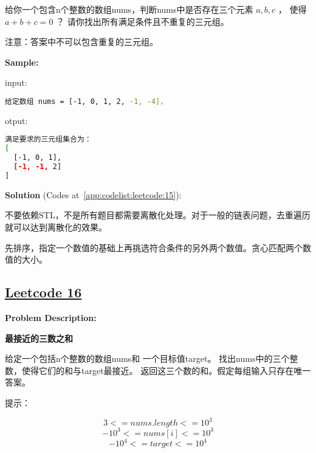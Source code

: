 给你一个包含n个整数的数组nums，判断nums中是否存在三个元素 $ a, b, c $ ，
使得 $ a + b + c = 0 $ ？
请你找出所有满足条件且不重复的三元组。\par

注意：答案中不可以包含重复的三元组。\par


\textbf{Sample:}\par

input:\par

\begin{lstlisting}[language=bash]
给定数组 nums = [-1, 0, 1, 2, -1, -4]，
\end{lstlisting}

otput:\par

\begin{lstlisting}[language=bash]
满足要求的三元组集合为：
[
  [-1, 0, 1],
  [-1, -1, 2]
]
\end{lstlisting}

\textbf{Solution }(Codes at~\ref{app:codelist:leetcode:15}):\par

不要依赖STL，不是所有题目都需要离散化处理。对于一般的链表问题，去重遍历就可以达到离散化的效果。\par

先排序，指定一个数值的基础上再挑选符合条件的另外两个数值。贪心匹配两个数值的大小。\par



\subsection{\href{https://leetcode-cn.com/}{Leetcode 16}}\label{app:problemlist:leetcode:16}

\textbf{Problem Description:}\par

\textbf{最接近的三数之和}\par

给定一个包括n个整数的数组nums和 一个目标值target。
找出nums中的三个整数，使得它们的和与target最接近。
返回这三个数的和。假定每组输入只存在唯一答案。\par

提示：\par

$$ 3 <= nums.length <= 10^{3} $$
$$ -10^{3} <= nums[i] <= 10^{3} $$
$$ -10^{4} <= target <= 10^{4} $$


